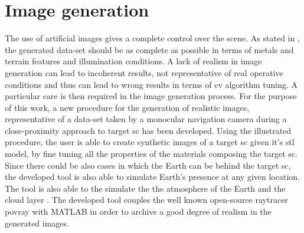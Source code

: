 \section{Image generation}
The use of artificial images gives a complete control over the scene. As stated in \cite{paolocorti}, the generated data-set should be as complete as possible in terms of metals and terrain features and illumination conditions. A lack of realism in image generation can lead to incoherent results, not representative of real operative conditions and thus can lead to wrong results in terms of \acrshort{cv} algorithm tuning. A particular care is then required in the image generation process.
For the purpose of this work, a new procedure for the generation of realistic images, representative of a data-set taken by a monocular navigation camera during a close-proximity approach to target \acrshort{sc} has been developed.
Using the illustrated procedure, the user is able to create synthetic images of a target \acrshort{sc} given it's \acrshort{stl} model, by fine tuning all the properties of the materials composing the target \acrshort{sc}.
Since there could be also cases in which the Earth can be behind the target \acrshort{sc}, the developed tool is also able to simulate Earth's presence at any given location. The tool is also able to the simulate the the atmosphere of the Earth and the cloud layer \cite{jacopo}.
The developed tool couples the well known open-source raytracer \acrshort{povray} with MATLAB in order to archive a good degree of realism in the generated images.


